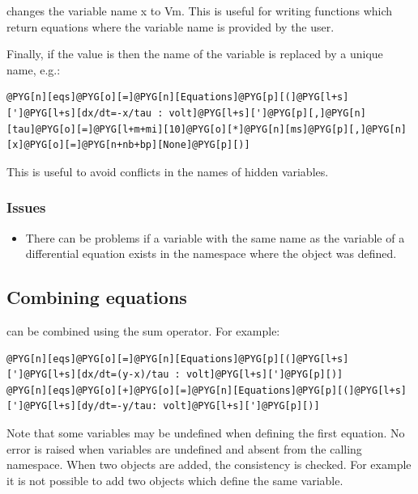 \documentclass[letterpaper,10pt,english]{manual}
\begin{document}
changes the variable name x to Vm. This is useful for writing functions which return
equations where the variable name is provided by the user.

Finally, if the value is  then the name of the variable is replaced by a unique
name, e.g.:

\begin{Verbatim}[commandchars=@\[\]]
@PYG[n][eqs]@PYG[o][=]@PYG[n][Equations]@PYG[p][(]@PYG[l+s][']@PYG[l+s][dx/dt=-x/tau : volt]@PYG[l+s][']@PYG[p][,]@PYG[n][tau]@PYG[o][=]@PYG[l+m+mi][10]@PYG[o][*]@PYG[n][ms]@PYG[p][,]@PYG[n][x]@PYG[o][=]@PYG[n+nb+bp][None]@PYG[p][)]
\end{Verbatim}

This is useful to avoid conflicts in the names of hidden variables.


\subsubsection{Issues}
\begin{itemize}
\item {} 
There can be problems if a variable with the same name as the variable of a
differential equation exists in the namespace where the \hyperlink{brian.Equations}{} object was defined.

\end{itemize}

\subsection{Combining equations}

\hyperlink{brian.Equations}{} can be combined using the sum operator. For example:

\begin{Verbatim}[commandchars=@\[\]]
@PYG[n][eqs]@PYG[o][=]@PYG[n][Equations]@PYG[p][(]@PYG[l+s][']@PYG[l+s][dx/dt=(y-x)/tau : volt]@PYG[l+s][']@PYG[p][)]
@PYG[n][eqs]@PYG[o][+]@PYG[o][=]@PYG[n][Equations]@PYG[p][(]@PYG[l+s][']@PYG[l+s][dy/dt=-y/tau: volt]@PYG[l+s][']@PYG[p][)]
\end{Verbatim}

Note that some variables may be undefined when defining the first equation. No error is
raised when variables are undefined and absent from the calling namespace.
When two \hyperlink{brian.Equations}{} objects are added, the consistency is checked. For example it is not
possible to add two \hyperlink{brian.Equations}{} objects which define the same variable.
\end{document}
